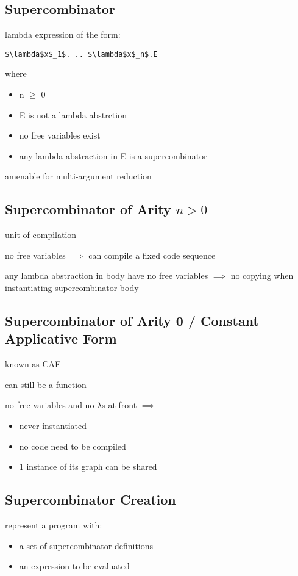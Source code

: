 \documentclass[8pt]{extarticle}
\begin{document}
\begin{multicols*}{2}
\subsection{Supercombinator}

lambda expression of the form:
\begin{lstlisting}
$\lambda$x$_1$. .. $\lambda$x$_n$.E
\end{lstlisting}
where
\begin{itemize}
\item n $\geq$ 0
\item E is not a lambda abstrction
\item no free variables exist
\item any lambda abstraction in E is a supercombinator
\end{itemize}

amenable for multi-argument reduction

\subsection{Supercombinator of Arity $n>0$}
unit of compilation

no free variables $\implies$ can compile a fixed code sequence

any lambda abstraction in body have no free variables $\implies$ no copying when instantiating supercombinator body

\subsection{Supercombinator of Arity 0 / Constant Applicative Form}

known as CAF

can still be a function

no free variables and no $\lambda$s at front $\implies$
\begin{itemize}
\item never instantiated
\item  no code need to be compiled
\item 1 instance of its graph can be shared
\end{itemize}

\subsection{Supercombinator Creation}

represent a program with:
\begin{itemize}
\item a set of supercombinator definitions
\item an expression to be evaluated
\end{itemize}


\end{multicols*}
\end{document}
